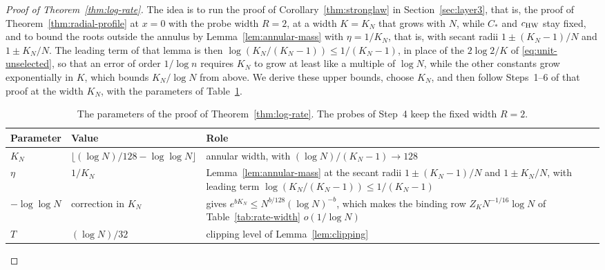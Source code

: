 \begin{proof}[Proof of Theorem~\ref{thm:log-rate}]
The idea is to run the proof of Corollary~\ref{thm:stronglaw} in
Section~\ref{sec:layer3}, that is, the proof of
Theorem~\ref{thm:radial-profile} at $x=0$ with the probe width $R=2$, at
a width $K=K_N$ that grows with $N$, while $C_*$ and $c_{\rm HW}$ stay
fixed, and to bound the roots outside the annulus by
Lemma~\ref{lem:annular-mass} with $\eta=1/K_N$, that is, with
secant radii $1\pm(K_N-1)/N$ and $1\pm K_N/N$. The leading term of that lemma is
then $\log(K_N/(K_N-1))\le1/(K_N-1)$, in place of the $2\log2/K$ of
\eqref{eq:unit-unselected}, so that an error of order $1/\log n$ requires
$K_N$ to grow at least like a multiple of $\log N$, while the other
constants grow exponentially in $K$, which bounds $K_N/\log N$ from
above. We derive these upper bounds, choose $K_N$, and then follow
Steps~1--6 of that proof at the width $K_N$, with the parameters of
Table~\ref{tab:rate-parameters}.

\begin{table}[!htbp]
\centering
\small
\begin{tabular}{@{}l>{\raggedright\arraybackslash}p{}
>{\raggedright\arraybackslash}p{}@{}}
\toprule
Parameter & Value & Role\\
\midrule
$K_N$ & $\lfloor(\log N)/128-\log\log N\rfloor$
 & annular width, with $(\log N)/(K_N-1)\to128$\\[2pt]
$\eta$ & $1/K_N$ & Lemma~\ref{lem:annular-mass} at the secant radii
 $1\pm(K_N-1)/N$ and $1\pm K_N/N$, with leading term
 $\log(K_N/(K_N-1))\le1/(K_N-1)$\\[2pt]
$-\log\log N$ & correction in $K_N$ & gives
 $e^{bK_N}\le N^{b/128}(\log N)^{-b}$, which makes the binding row
 $Z_KN^{-1/16}\log N$ of Table~\ref{tab:rate-width} $o(1/\log N)$\\[2pt]
$T$ & $(\log N)/32$ & clipping level of Lemma~\ref{lem:clipping}\\
\bottomrule
\end{tabular}
\caption{The parameters of the proof of Theorem~\ref{thm:log-rate}. The
probes of Step~4 keep the fixed width $R=2$.}
\label{tab:rate-parameters}
\end{table}


\end{proof}
